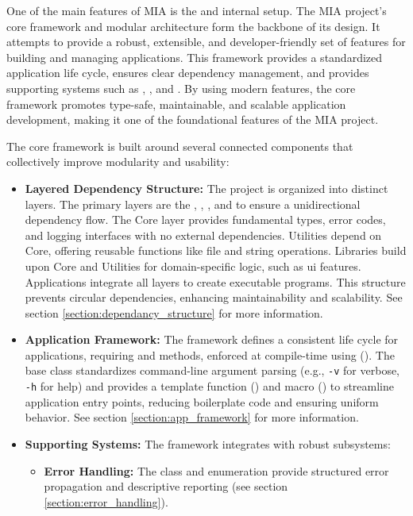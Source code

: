 One of the main features of MIA is the  and internal setup. The MIA project's core framework and modular architecture form the backbone of its design. It attempts to provide a robust, extensible, and developer-friendly set of features for building and managing applications. This framework provides a standardized application life cycle, ensures clear dependency management, and provides supporting systems such as , , and . By using modern  features, the core framework promotes type-safe, maintainable, and scalable application development, making it one of the foundational features of the MIA project.

The core framework is built around several connected components that collectively improve modularity and usability:
\begin{itemize}\itemsep0em
	\item \textbf{Layered Dependency Structure:} The project is organized into distinct layers. The primary layers are the , , , and  to ensure a unidirectional dependency flow. The Core layer provides fundamental types, error codes, and logging interfaces with no external dependencies. Utilities depend on Core, offering reusable functions like file and string operations. Libraries build upon Core and Utilities for domain-specific logic, such as ui features. Applications integrate all layers to create executable programs. This structure prevents circular dependencies, enhancing maintainability and scalability. See section \ref{section:dependancy_structure} for more information.
	\item \textbf{Application Framework:} The framework defines a consistent life cycle for applications, requiring  and  methods, enforced at compile-time using   (). The  base class standardizes command-line argument parsing (e.g., \texttt{-v} for verbose, \texttt{-h} for help) and provides a template function () and macro () to streamline application entry points, reducing boilerplate code and ensuring uniform behavior. See section \ref{section:app_framework} for more information.
	\item \textbf{Supporting Systems:} The framework integrates with robust subsystems:
	\begin{itemize}\itemsep0em
		\item \textbf{Error Handling:} The  class and  enumeration provide structured error propagation and descriptive reporting (see section \ref{section:error_handling}).

\end{itemize}
\end{itemize}

